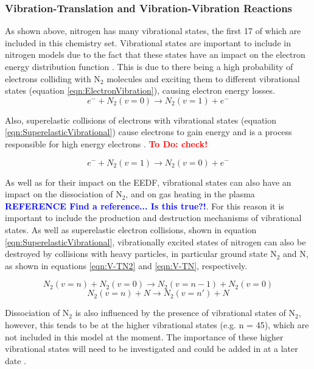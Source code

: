 \documentclass[11pt, oneside]{article}   	%
\newcommand{\todo}[1]{ \textcolor{red}{\bf{To Do:} #1}}
\newcommand{\toref}[1]{ \textcolor{blue}{\bf{REFERENCE #1}}}
\begin{document}
\subsubsection*{Vibration-Translation and Vibration-Vibration Reactions}

As shown above, nitrogen has many vibrational states, the first 17 of which are included in this chemistry set.
Vibrational states are important to include in nitrogen models due to the fact that these states have an impact on the electron energy distribution function \cite{Guerra2004kinetic}.
This is due to there being a high probability of electrons colliding with N$_2$ molecules and exciting them to different vibrational states (equation \ref{eqn:ElectronVibration}), causing electron energy losses.
\begin{equation}
e^- + N_2(v=0) \rightarrow N_2(v=1) + e^-
\label{eqn:ElectronVibration}
\end{equation}

Also, superelastic collisions of electrons with vibrational states (equation \ref{eqn:SuperelasticVibrational}) cause electrons to gain energy and is a process responsible for high energy electrons \cite{Guerra2004kinetic}. \todo{check!}

\begin{equation}
e^- + N_2(v=1) \rightarrow N_2(v=0) + e^-
\label{eqn:SuperelasticVibrational}
\end{equation}

As well as for their impact on the EEDF, vibrational states can also have an impact on the dissociation of N$_2$, and on gas heating in the plasma \toref{Find a reference... Is this true?!}.
For this reason it is important to include the production and destruction mechanisms of vibrational states.
As well as superelastic electron collisions, shown in equation \ref{eqn:SuperelasticVibrational}, vibrationally excited states of nitrogen can also be destroyed by collisions with heavy particles, in particular ground state N$_2$ and N, as shown in equations \ref{eqn:V-TN2} and \ref{eqn:V-TN}, respectively.

\begin{equation}
N_2(v=n) + N_2 (v=0) \rightarrow N_2(v=n-1) + N_2(v=0)
\label{eqn:V-TN2}
\end{equation}
\begin{equation}
N_2(v=n) + N \rightarrow N_2(v=n') + N
\label{eqn:V-TN}
\end{equation}

Dissociation of N$_2$ is also influenced by the presence of vibrational states of N$_2$, however, this tends to be at the higher vibrational states (e.g. n = 45), which are not included in this model at the moment. 
The importance of these higher vibrational states will need to be investigated and could be added in at a later date \cite{Guerra2004kinetic}.
\end{document}
